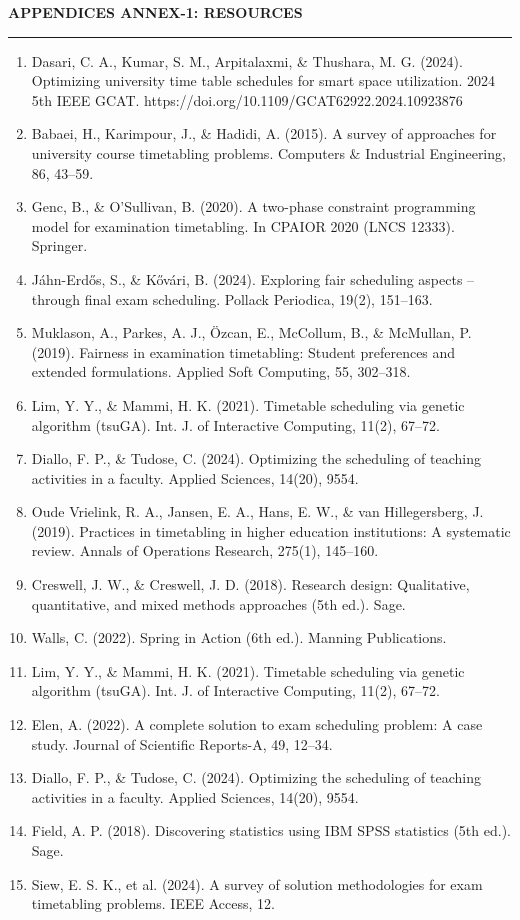 \documentclass[10pt,a4paper]{article}
\newcommand{\sectionlabel}[1]{\vspace{1.2em}\noindent\textbf{\fontsize{10.5}{12}\selectfont #1}\par\vspace{0.4em}}
\newcommand{\formline}{\vspace{1em}\noindent\rule{\textwidth}{0.5pt}\vspace{1em}}
\begin{document}
\sectionlabel{APPENDICES ANNEX-1: RESOURCES}
\formline
\begin{enumerate}[leftmargin=1.4em]
\item Dasari, C. A., Kumar, S. M., Arpitalaxmi, \& Thushara, M. G. (2024). Optimizing university time table schedules for smart space utilization. 2024 5th IEEE GCAT. https://doi.org/10.1109/GCAT62922.2024.10923876
\item Babaei, H., Karimpour, J., \& Hadidi, A. (2015). A survey of approaches for university course timetabling problems. Computers \& Industrial Engineering, 86, 43–59.
\item Genc, B., \& O’Sullivan, B. (2020). A two-phase constraint programming model for examination timetabling. In CPAIOR 2020 (LNCS 12333). Springer.
\item Jáhn-Erdős, S., \& Kővári, B. (2024). Exploring fair scheduling aspects -- through final exam scheduling. Pollack Periodica, 19(2), 151–163.
\item Muklason, A., Parkes, A. J., Özcan, E., McCollum, B., \& McMullan, P. (2019). Fairness in examination timetabling: Student preferences and extended formulations. Applied Soft Computing, 55, 302–318.
\item Lim, Y. Y., \& Mammi, H. K. (2021). Timetable scheduling via genetic algorithm (tsuGA). Int. J. of Interactive Computing, 11(2), 67–72.
\item Diallo, F. P., \& Tudose, C. (2024). Optimizing the scheduling of teaching activities in a faculty. Applied Sciences, 14(20), 9554.
\item Oude Vrielink, R. A., Jansen, E. A., Hans, E. W., \& van Hillegersberg, J. (2019). Practices in timetabling in higher education institutions: A systematic review. Annals of Operations Research, 275(1), 145–160.
\item Creswell, J. W., \& Creswell, J. D. (2018). Research design: Qualitative, quantitative, and mixed methods approaches (5th ed.). Sage.
\item Walls, C. (2022). Spring in Action (6th ed.). Manning Publications.
\item Lim, Y. Y., \& Mammi, H. K. (2021). Timetable scheduling via genetic algorithm (tsuGA). Int. J. of Interactive Computing, 11(2), 67–72.
\item Elen, A. (2022). A complete solution to exam scheduling problem: A case study. Journal of Scientific Reports-A, 49, 12–34.
\item Diallo, F. P., \& Tudose, C. (2024). Optimizing the scheduling of teaching activities in a faculty. Applied Sciences, 14(20), 9554.
\item Field, A. P. (2018). Discovering statistics using IBM SPSS statistics (5th ed.). Sage.
\item Siew, E. S. K., et al. (2024). A survey of solution methodologies for exam timetabling problems. IEEE Access, 12.
\end{enumerate}
\end{document}
